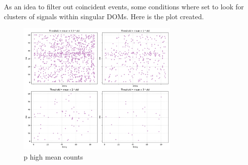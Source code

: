 As an idea to filter out coincident events, some conditions where set to look for clusters of signals within singular DOMs. Here is the plot created.

\begin{figure}
    \centering
    \includegraphics[width=0.7\textwidth]{Plots/p_high_mean_counts.png}
    \caption{p high mean counts}
\end{figure}


